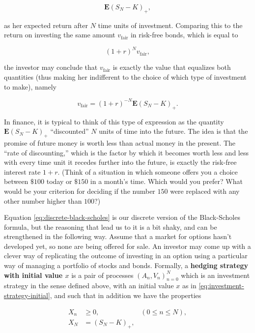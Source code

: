 \documentclass[11pt]{report}
\theoremstyle{plain}
\theoremstyle{definition}
\begin{document}
\[
\mathbf{E}(S_N-K)_+,
\]

\noindent as her expected return after $N$ time units of
investment. Comparing this to the return on investing
the same amount $v_\textrm{fair}$ in risk-free bonds,
which is equal to

\[
(1+r)^N v_\textrm{fair},
\]

\noindent the investor may conclude that $v_\textrm{fair}$ is
exactly the value that equalizes both quantities (thus
making her indifferent to the choice of which type of
investment to make), namely

\begin{equation*} \tag{11}\label{eq:discrete-black-scholes}
v_\textrm{fair} = (1+r)^{-N} \mathbf{E}(S_N-K)_+.
\end{equation*}

\noindent In finance, it is typical to think of this type of
expression as the quantity $\mathbf{E}(S_N-K)_+$
``discounted'' $N$ units of time into the future. The
idea is that the promise of future money is worth less
than actual money in the present. The ``rate of
discounting,'' which is the factor by which it becomes
worth less and less with every time unit it recedes
further into the future, is exactly the risk-free
interest rate $1+r$. (Think of a situation in which
someone offers you a choice between \(\$100\) today
or \(\$150\) in a month's time. Which would you
prefer? What would be your criterion for deciding if
the number $150$ were replaced with any other number
higher than $100$?)

Equation \eqref{eq:discrete-black-scholes} is our
discrete version of the Black-Scholes formula, but the
reasoning that lead us to it is a bit shaky, and can
be strengthened in the following way. Assume that a
market for options hasn't developed yet, so none are
being offered for sale. An investor may come up with a
clever way of replicating the outcome of investing in
an option using a particular way of managing a
portfolio of stocks and bonds. Formally, a \textbf{hedging
strategy with initial value $x$} is a pair of
processes $(A_n,V_n)_{n=0}^N$ which is an investment
strategy in the sense defined above, with an initial
value $x$ as in \eqref{eq:investment-strategy-initial},
and such that in addition we have the properties

\begin{align*}
X_n &\ge 0,  \qquad \qquad \qquad (0\le n\le N), \\
X_N &= (S_N-K)_+,
\end{align*}
\end{document}

